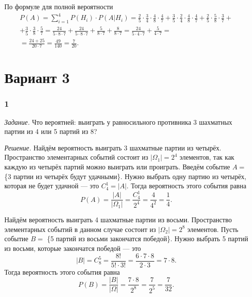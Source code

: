 По формуле для полной вероятности
\begin{equation*}
\begin{split}
P \left( A \right) =
\sum \limits_{i=1}^4 P \left( H_i \right) \cdot P \left( \left. A \right| H_i \right) =
\frac{2}{5} \cdot \frac{3}{4} \cdot \frac{4}{8} \cdot \frac{4}{7} +
\frac{3}{5} \cdot \frac{2}{4} \cdot \frac{4}{8} \cdot \frac{4}{7} + \frac{2}{5} \cdot \frac{5}{8} \cdot \frac{3}{7} +  \\
+ \frac{3}{5} \cdot \frac{3}{8} \cdot \frac{5}{7} =
\frac{24}{5 \cdot 8 \cdot 7} + \frac{24}{5 \cdot 8 \cdot 7} + \frac{5}{8 \cdot 7} + \frac{8}{8 \cdot 7} =
\frac{24}{5 \cdot 4 \cdot 7} + \frac{5}{4 \cdot 7} = \\
= \frac{24 + 25}{20 \cdot 7} =
\frac{49}{140} =
\frac{7}{20}.
\end{split}
\end{equation*}

\section*{Вариант 3}

\subsubsection*{1}

\textit{Задание.} Что вероятней: выиграть у равносильного противника 3 шахматных партии из 4 или 5 партий из 8?

\textit{Решение.} Найдём вероятность выиграть 3 шахматные партии из четырёх.
Пространство элементарных событий состоит из $ \left| \Omega_1 \right| = 2^4$ элементов,
так как каждую из четырёх партий можно выиграть или проиграть.
Введём событие $A =$ \{3 партии из четырёх будут удачными\}.
Нужно выбрать одну партию из четырёх, которая не будет удачной --- это $C_4^1 = \left| A \right| $.
Тогда вероятность этого события равна
$$P \left( A \right) =
\frac{ \left| A \right| }{ \left| \Omega_1 \right| } =
\frac{C_4^1}{2^4} =
\frac{4}{4^2} =
\frac{1}{4}.$$

Найдём вероятность выиграть 4 шахматные партии из восьми.
Пространство элементарных событий в данном случае состоит из $ \left| \Omega_2 \right| = 2^8$ элементов.
Пусть событие $B =$ \{5 партий из восьми закончатся победой\}.
Нужно выбрать 5 партий из восьми, которые закончатся победой --- это
$$ \left| B \right| =
C_8^5 =
\frac{8!}{5! \cdot 3!} =
\frac{6 \cdot 7 \cdot 8}{2 \cdot 3} =
7 \cdot 8.$$
Тогда вероятность этого события равна
$$P \left( B \right) =
\frac{ \left| B \right| }{ \left| \Omega \right| } =
\frac{7  \cdot 8}{2^8} =
\frac{7}{2^5} =
\frac{7}{32}.$$


